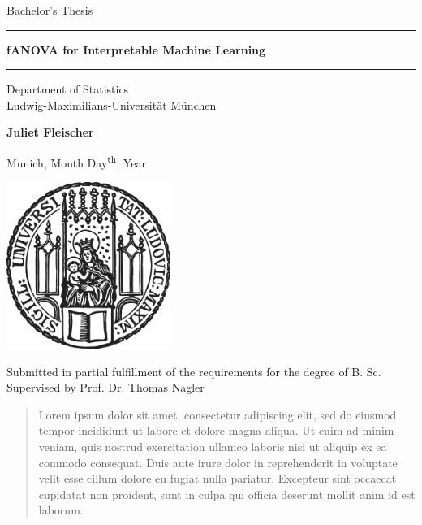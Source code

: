 \documentclass[12pt]{article}
\newcommand{\mytitle}{fANOVA for Interpretable Machine Learning}
\newcommand{\myname}{Juliet Fleischer}
\newcommand{\mysupervisor}{Prof. Dr. Thomas Nagler}
\begin{document}
 
\begin{titlepage}
\begin{center}
    
\LARGE
Bachelor's Thesis
    
\vspace{0.5cm}
      
\rule{\textwidth}{1.5pt}
\LARGE
\textbf{\mytitle}
\rule{\textwidth}{1.5pt}
   
\vspace{0.5cm}
      
\large
Department of Statistics \\
Ludwig-Maximilians-Universität München 

\vfill

\Large
\textbf{\myname}

\vfill

\large
Munich, Month Day\textsuperscript{th}, Year
      
\vfill

\includegraphics[width = 0.4\textwidth]{sigillum.png}

\vfill

\normalsize
Submitted in partial fulfillment of the requirements for the degree of B. Sc.
\\

Supervised by \mysupervisor

\end{center}
\end{titlepage}


\newpage

\begin{abstract}

Lorem ipsum dolor sit amet, consectetur adipiscing elit, sed do eiusmod tempor 
incididunt ut labore et dolore magna aliqua. Ut enim ad minim veniam, quis 
nostrud exercitation ullamco laboris nisi ut aliquip ex ea commodo consequat. 
Duis aute irure dolor in reprehenderit in voluptate velit esse cillum dolore eu 
fugiat nulla pariatur. Excepteur sint occaecat cupidatat non proident, sunt in 
culpa qui officia deserunt mollit anim id est laborum.

\end{abstract}
\end{document}
